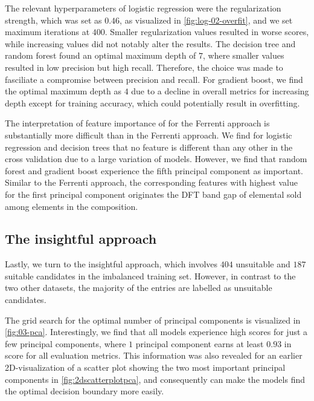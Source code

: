 The relevant hyperparameters of logistic regression were the regularization strength, which was set as $0.46$, as visualized in \autoref{fig:log-02-overfit}, and we set maximum iterations at $400$. Smaller regularization values resulted in worse scores, while increasing values did not notably alter the results. The decision tree and random forest found an optimal maximum depth of $7$, where smaller values resulted in low precision but high recall. Therefore, the choice was made to fasciliate a compromise between precision and recall. For gradient boost, we find the optimal maximum depth as $4$ due to a decline in overall metrics for increasing depth except for training accuracy, which could potentially result in overfitting.


The interpretation of feature importance of for the Ferrenti approach is substantially more difficult than in the Ferrenti approach. We find for logistic regression and decision trees that no feature is different than any other in the cross validation due to a large variation of models. However, we find that random forest and gradient boost experience the fifth principal component as important. Similar to the Ferrenti approach, the corresponding features with highest value for the first principal component originates the DFT band gap of elemental sold among elements in the composition.

\subsection{The insightful approach}

Lastly, we turn to the insightful approach, which involves $404$ unsuitable and $187$ suitable candidates in the imbalanced training set. However, in contrast to the two other datasets, the majority of the entries are labelled as unsuitable candidates.

The grid search for the optimal number of principal components is visualized in \autoref{fig:03-pca}. Interestingly, we find that all models experience high scores for just a few principal components, where $1$ principal component earns at least $0.93$ in score for all evaluation metrics. This information was also revealed for an earlier 2D-visualization of a scatter plot showing the two most important principal components in \autoref{fig:2dscatterplotpca}, and consequently can make the models find the optimal decision boundary more easily.

